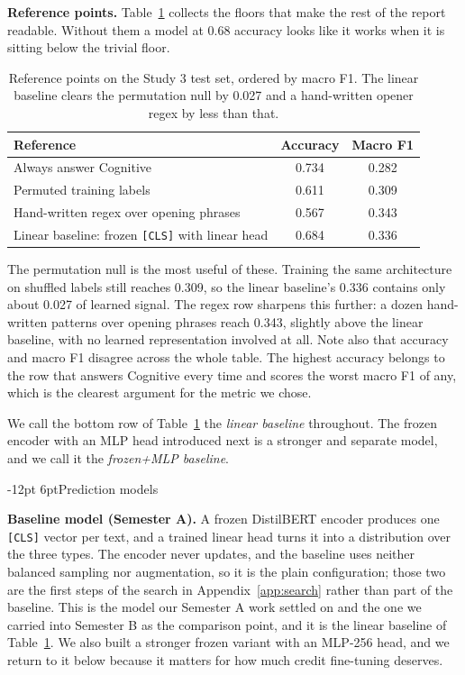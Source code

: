 \documentclass[11pt,a4paper]{article}
\makeatletter
\renewcommand\section{\@startsection{section}{1}{\z@}%
  {-12pt \@plus -3pt \@minus -2pt}{6pt}{\normalfont\large\bfseries}}
\makeatother
\begin{document}
\textbf{Reference points.} Table~\ref{tab:refs} collects the floors that make the rest of
the report readable. Without them a model at 0.68 accuracy looks like it works when it is
sitting below the trivial floor.

\begin{table}[h]
\centering
\small
\caption{Reference points on the Study 3 test set, ordered by macro F1. The linear baseline
clears the permutation null by 0.027 and a hand-written opener regex by less than that.}
\label{tab:refs}
\begin{tabular}{lcc}
\toprule
Reference & Accuracy & Macro F1 \\
\midrule
Always answer Cognitive & 0.734 & 0.282 \\
Permuted training labels & 0.611 & 0.309 \\
Hand-written regex over opening phrases & 0.567 & 0.343 \\
Linear baseline: frozen \texttt{[CLS]} with linear head & 0.684 & 0.336 \\
\bottomrule
\end{tabular}
\end{table}

The permutation null is the most useful of these. Training the same architecture on
shuffled labels still reaches 0.309, so the linear baseline's 0.336 contains only about
0.027 of learned signal. The regex row sharpens this further: a dozen hand-written patterns
over opening phrases reach 0.343, slightly above the linear baseline, with no learned
representation involved at all. Note also that accuracy and macro F1 disagree across the
whole table. The highest accuracy belongs to the row that answers Cognitive every time and
scores the worst macro F1 of any, which is the clearest argument for the metric we chose.

We call the bottom row of Table~\ref{tab:refs} the \emph{linear baseline} throughout. The
frozen encoder with an MLP head introduced next is a stronger and separate model, and we
call it the \emph{frozen+MLP baseline}.

\section{Prediction models}
\label{sec:models}

\textbf{Baseline model (Semester A).} A frozen DistilBERT encoder produces one
\texttt{[CLS]} vector per text, and a trained linear head turns it into a distribution over
the three types. The encoder never updates, and the baseline uses neither balanced sampling
nor augmentation, so it is the plain configuration; those two are the first steps of the
search in Appendix~\ref{app:search} rather than part of the baseline. This is the model our
Semester A work settled on and the one we carried into Semester B as the comparison point,
and it is the linear baseline of Table~\ref{tab:refs}. We also built a stronger frozen variant with an MLP-256
head, and we return to it below because it matters for how much credit fine-tuning deserves.
\end{document}
